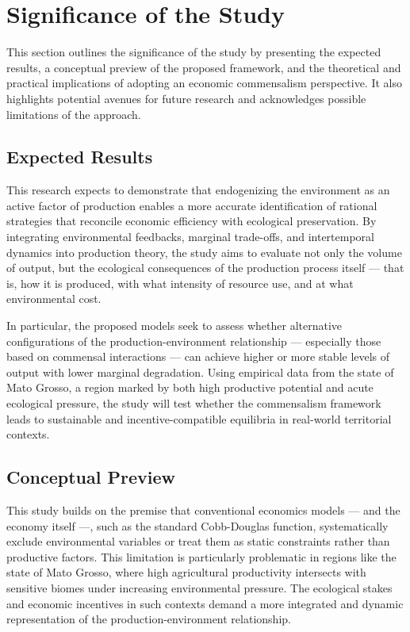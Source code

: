 

\section{Significance of the Study}

This section outlines the significance of the study by presenting the expected results, a conceptual preview of the proposed framework, and the theoretical and practical implications of adopting an economic commensalism perspective. It also highlights potential avenues for future research and acknowledges possible limitations of the approach.

\subsection{Expected Results}

This research expects to demonstrate that endogenizing the environment as an active factor of production enables a more accurate identification of rational strategies that reconcile economic efficiency with ecological preservation. By integrating environmental feedbacks, marginal trade-offs, and intertemporal dynamics into production theory, the study aims to evaluate not only the volume of output, but the ecological consequences of the production process itself — that is, how it is produced, with what intensity of resource use, and at what environmental cost.

In particular, the proposed models seek to assess whether alternative configurations of the production-environment relationship — especially those based on commensal interactions — can achieve higher or more stable levels of output with lower marginal degradation. Using empirical data from the state of Mato Grosso, a region marked by both high productive potential and acute ecological pressure, the study will test whether the commensalism framework leads to sustainable and incentive-compatible equilibria in real-world territorial contexts.

\subsection{Conceptual Preview}

This study builds on the premise that conventional economics models — and the economy itself —, such as the standard Cobb-Douglas function, systematically exclude environmental variables or treat them as static constraints rather than productive factors. This limitation is particularly problematic in regions like the state of Mato Grosso, where high agricultural productivity intersects with sensitive biomes under increasing environmental pressure. The ecological stakes and economic incentives in such contexts demand a more integrated and dynamic representation of the production-environment relationship.

